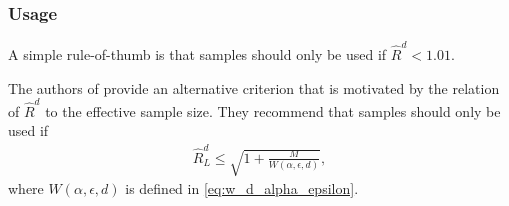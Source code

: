 \documentclass[10pt]{article}
\numberwithin{equation}{section}
\begin{document}
\subsubsection*{Usage}

A simple rule-of-thumb \cite{VehGelSimCarBur21} is that samples should only be used if $\hat R^d < 1.01$.

The authors of \cite{VatKnu21} provide an alternative criterion that is motivated by the relation of $\hat R^d$ to the effective sample size. They recommend that samples should only be used if
\begin{align*}
\hat R^d_L \leq \sqrt{1 + \frac{M}{W(\alpha, \epsilon, d)}},
\end{align*}
where $W(\alpha, \epsilon, d)$ is defined in \eqref{eq:w_d_alpha_epsilon}.







\printbibliography
\end{document}
